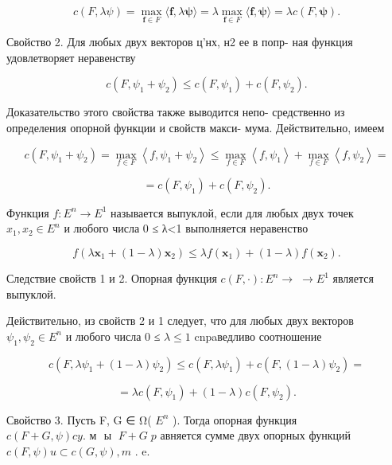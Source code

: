 \documentclass[8pt]{extarticle}
\begin{document}
\[
c\left( {F,{\lambda \psi }}\right)  = \mathop{\max }\limits_{{\mathbf{f} \in  F}}\langle \mathbf{f},\lambda \mathbf{\psi }\rangle  = \lambda \mathop{\max }\limits_{{\mathbf{f} \in  F}}\langle \mathbf{f},\mathbf{\psi }\rangle  = {\lambda c}\left( {F,\mathbf{\psi }}\right) .
\]

Свойство 2. Для любых двух векторов ц’нх, н2 ее в попр- ная функция удовлетворяет неравенству

\[
c\left( {F,{\psi }_{1} + {\psi }_{2}}\right)  \leq  c\left( {F,{\psi }_{1}}\right)  + c\left( {F,{\psi }_{2}}\right) .
\]

Доказательство этого свойства также выводится непо- средственно из определения опорной функции и свойств макси- мума. Действительно, имеем

\[
c\left( {F,{\psi }_{1} + {\psi }_{2}}\right)  = \mathop{\max }\limits_{{f \in  F}}\left\langle  {f,{\psi }_{1} + {\psi }_{2}}\right\rangle   \leq  \mathop{\max }\limits_{{f \in  F}}\left\langle  {f,{\psi }_{1}}\right\rangle   + \mathop{\max }\limits_{{f \in  F}}\left\langle  {f,{\psi }_{2}}\right\rangle   =
\]

\[
= c\left( {F,{\psi }_{1}}\right)  + c\left( {F,{\psi }_{2}}\right) .
\]

Функция \(f : {E}^{n} \rightarrow  {E}^{1}\) называется выпуклой, если для любых двух точек \({x}_{1},{x}_{2} \in  {E}^{n}\) и любого числа 0 ≤ λ<1 выполняется неравенство

\[
f\left( {\lambda {\mathbf{x}}_{1} + \left( {1 - \lambda }\right) {\mathbf{x}}_{2}}\right)  \leq  {\lambda f}\left( {\mathbf{x}}_{1}\right)  + \left( {1 - \lambda }\right) f\left( {\mathbf{x}}_{2}\right) .
\]

Следствие свойств 1 и 2. Опорная функция \(c\left( {F, \cdot  }\right)  : {E}^{n} \rightarrow \; \rightarrow  {E}^{1}\) является выпуклой.

Действительно, из свойств 2 и 1 следует, что для любых двух векторов \({\psi }_{1},{\psi }_{2} \in  {E}^{n}\) и любого числа 0 ≤ \(\lambda  \leq  1\) cnpaведливо соотношение

\[
c\left( {F,\lambda {\psi }_{1} + \left( {1 - \lambda }\right) {\psi }_{2}}\right)  \leq  c\left( {F,\lambda {\psi }_{1}}\right)  + c\left( {F,\left( {1 - \lambda }\right) {\psi }_{2}}\right)  =
\]

\[
= {\lambda c}\left( {F,{\psi }_{1}}\right)  + \left( {1 - \lambda }\right) c\left( {F,{\psi }_{2}}\right) .
\]

Свойство 3. Пусть F, G ∈ Ω( \({E}^{n}\) ). Тогда опорная функция \(c\left( {F + G,\psi }\right) {cy}.{\text{ м }\text{ ы }}\;F + G\;p\) авняется сумме двух опорных функций \(c\left( {F,\psi }\right) u \subset  c\left( {G,\psi }\right) ,m\) . e.
\end{document}
